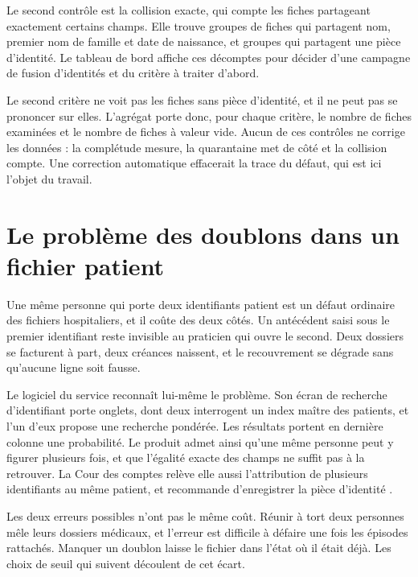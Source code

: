 Le second contrôle est la collision exacte, qui compte les fiches partageant exactement certains
champs. Elle trouve  groupes de fiches qui partagent nom, premier nom
de famille et date de naissance, et  groupes qui partagent une
pièce d'identité. Le tableau de bord affiche ces décomptes pour décider d'une campagne de fusion
d'identités et du critère à traiter d'abord.

Le second critère ne voit pas les
 fiches sans pièce d'identité, et il ne peut pas se prononcer sur
elles. L'agrégat porte donc, pour chaque critère, le nombre de fiches examinées et le nombre de
fiches à valeur vide. Aucun de ces contrôles ne corrige les données : la complétude mesure, la quarantaine met de côté et
la collision compte. Une correction automatique effacerait la trace du défaut, qui est ici l'objet
du travail.

\section{Le problème des doublons dans un fichier patient}

Une même personne qui porte deux identifiants patient est un défaut ordinaire des fichiers
hospitaliers, et il coûte des deux côtés. Un antécédent saisi sous le premier identifiant reste
invisible au praticien qui ouvre le second. Deux dossiers se facturent à part, deux créances
naissent, et le recouvrement se dégrade sans qu'aucune ligne soit fausse.

Le logiciel du service reconnaît lui-même le problème. Son écran de recherche d'identifiant porte  onglets, dont deux interrogent un index maître des patients, et l'un d'eux propose une
recherche pondérée. Les résultats portent en dernière colonne une
probabilité. Le produit admet ainsi qu'une même personne peut y figurer
plusieurs fois, et que l'égalité exacte des champs ne suffit pas à la retrouver. La Cour des
comptes relève elle aussi l'attribution de plusieurs identifiants au même patient, et recommande
d'enregistrer la pièce d'identité \cite{s20}.

Les deux erreurs possibles n'ont pas le même coût. Réunir à tort deux personnes mêle leurs dossiers
médicaux, et l'erreur est difficile à défaire une fois les épisodes rattachés. Manquer un doublon
laisse le fichier dans l'état où il était déjà. Les choix de seuil qui suivent découlent de cet
écart.

